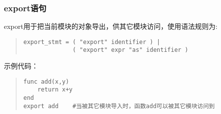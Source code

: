 \subsubsection{export语句}
export用于把当前模块的对象导出，供其它模块访问，使用语法规则为:
\begin{quote}
\begin{verbatim}
export_stmt = ( "export" identifier ) |
              ( "export" expr "as" identifier )
\end{verbatim}
\end{quote}
示例代码：
\begin{quote}
\begin{verbatim}
func add(x,y)
    return x+y
end 
export add    #当被其它模块导入时，函数add可以被其它模块访问到
\end{verbatim}
\end{quote}













